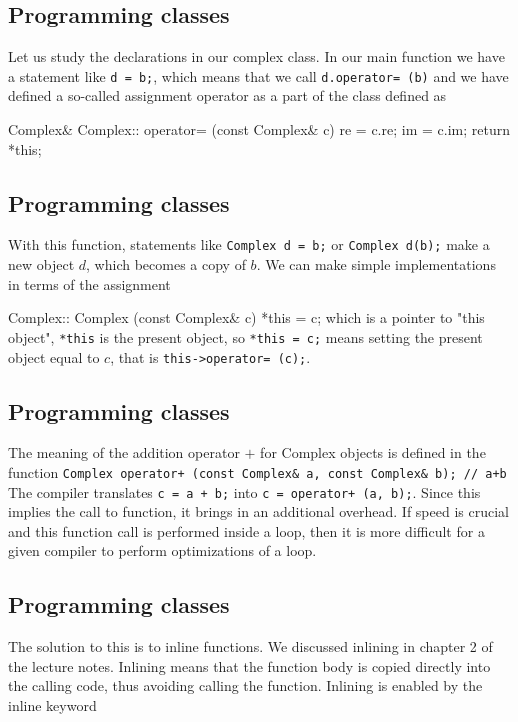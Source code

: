 \documentclass[%
oneside,                 %
final,                   %
10pt]{article}
\begin{document}
{{{{{{{{%
\subsection{Programming classes}

Let us study the declarations in our complex class.
In our main function we have a statement like \Verb!d = b;!, which means
that we call \Verb!d.operator= (b)! and we have defined a so-called assignment operator
as a part of the class defined as

\bcppcod
Complex& Complex:: operator= (const Complex& c)
{
   re = c.re;
   im = c.im;
   return *this;
}
\ecppcod

\subsection{Programming classes}

With this function, statements like
\Verb!Complex d = b;! or \Verb!Complex d(b);!
make a new object $d$, which becomes a copy of $b$.
We can make simple implementations in terms of the assignment

\bcppcod
Complex:: Complex (const Complex& c)
{ *this = c; }
\ecppcod
which  is a pointer to "this object", \Verb!*this! is the present object,
so \Verb!*this = c;! means setting the present object equal to $c$, that is
\Verb!this->operator= (c);!.

\subsection{Programming classes}

The meaning of the addition operator $+$ for Complex objects is defined in the
function
\Verb!Complex operator+ (const Complex& a, const Complex& b); // a+b!
The compiler translates \Verb!c = a + b;! into \Verb!c = operator+ (a, b);!.
Since this implies the call to function, it brings in an additional overhead. If speed
is crucial and this function call is performed inside a loop, then it is more difficult for a
given compiler to perform optimizations of a loop.

\subsection{Programming classes}

The solution to this is to inline functions.   We discussed inlining in chapter
2 of the lecture notes.
Inlining means that the function body is copied directly into
the calling code, thus avoiding calling the function.
Inlining is enabled by the inline keyword

}}}}}}}}
\end{document}

